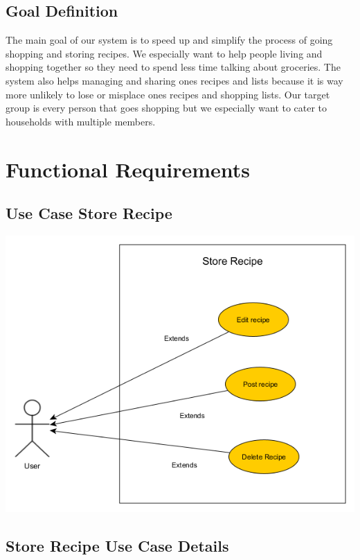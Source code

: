 \documentclass[12pt]{article}
\theoremstyle{definition}
\begin{document}
\subsection{Goal Definition}

The main goal of our system is to speed up and simplify the process of going shopping and storing recipes. We especially want to help people living and shopping together so they need to spend less time talking about groceries. The system also helps managing and sharing ones recipes and lists because it is way more unlikely to lose or misplace ones recipes and shopping lists.
Our target group is every person that goes shopping but we especially want to cater to households with multiple members.

\pagebreak

\section{Functional Requirements}

\subsection{Use Case Store Recipe}

\includegraphics[scale=.5]{UseCaseStoreRecipe.png}\\

\subsection{Store Recipe Use Case Details}
\end{document}
